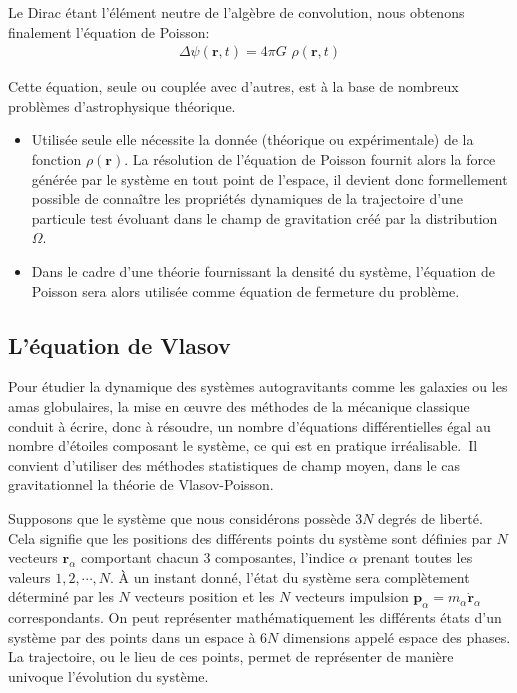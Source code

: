 Le Dirac étant l'élément neutre de l'algèbre de convolution, nous obtenons finalement l'équation de Poisson:
\begin{align*}
	\Delta\psi(\mathbf{r},t)=4\pi G\,\,\rho(\mathbf{r},t)
\end{align*}

Cette équation, seule ou couplée avec d'autres, est à la base de nombreux problèmes d'astrophysique théorique.

\begin{itemize}

	\item Utilisée seule elle nécessite la donnée (théorique ou expérimentale) de la fonction $\rho(\mathbf{r})$. La résolution de l'équation de
		Poisson fournit alors la force générée par le système en tout point de l'espace, il devient donc formellement possible de
		connaître les propriétés dynamiques de la trajectoire d'une particule test évoluant dans le champ de gravitation créé par la
		distribution $\Omega$.

	\item Dans le cadre d'une théorie fournissant la densité du système, l'équation de Poisson sera alors utilisée comme équation de fermeture
		du problème.

\end{itemize}

\subsection{L'équation de Vlasov}

Pour étudier la dynamique des systèmes autogravitants comme les galaxies ou les amas globulaires, la mise en œuvre des méthodes de la mécanique
classique conduit à écrire, donc à résoudre, un nombre d'équations différentielles égal au nombre d'étoiles composant le système, ce qui est en
pratique irréalisable.\ Il convient d'utiliser des méthodes statistiques de champ moyen, dans le cas gravitationnel la théorie de Vlasov-Poisson.

Supposons que le système que nous considérons possède $3N$ degrés de liberté. Cela signifie que les positions des différents points du système sont
définies par $N$ vecteurs $\mathbf{r}_{\alpha}$ comportant chacun 3 composantes, l'indice $\alpha$ prenant toutes les valeurs $1,2,\cdots,N$. À un
instant donné, l'état du système sera complètement déterminé par les $N$ vecteurs position et les $N$ vecteurs impulsion
$\mathbf{p}_{\alpha}=m_{\alpha}\mathbf{\dot{r}}_{\alpha}$ correspondants. On peut représenter mathématiquement les différents états d'un système par
des points dans un espace à $6N$ {dimension}s appelé espace des phases. La trajectoire, ou le lieu de ces points, permet de représenter de manière
univoque l'évolution du système.

